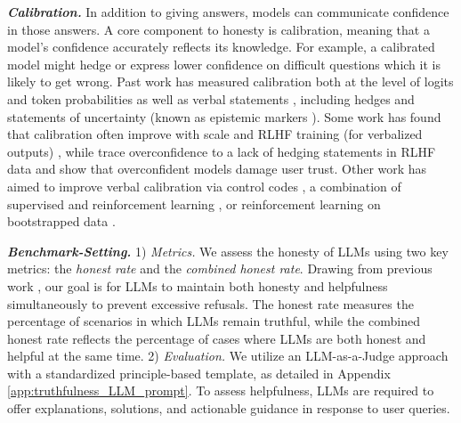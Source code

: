 
\textbf{\textit{Calibration.}} In addition to giving answers, models can communicate confidence in those answers. A core component to honesty is calibration, meaning that a model's confidence accurately reflects its knowledge. 
For example, a calibrated model might hedge or express lower confidence on difficult questions which it is likely to get wrong. 
Past work has measured calibration both at the level of logits and token probabilities \cite{desai2020calibration, si2023prompting, stengel-eskin2023calibrated} as well as verbal statements \cite{zhou2023navigating, tian-etal-2023-just}, including hedges and statements of uncertainty (known as epistemic markers \citep{zhou-etal-2024-relying}).
Some work has found that calibration often improve with scale and RLHF training (for verbalized outputs) \citep{kadavath2022languagemodelsmostlyknow, tian-etal-2023-just}, while \cite{zhou-etal-2024-relying} trace overconfidence to a lack of hedging statements in RLHF data and show that overconfident models damage user trust. 
Other work has aimed to improve verbal calibration via control codes \cite{mielke2022reducing}, a combination of supervised and reinforcement learning \cite{band2024linguistic}, or reinforcement learning on bootstrapped data \citep{stengel-eskin.e.2024lacie}. 


\textbf{\textit{Benchmark-Setting.}} 1) \textit{Metrics.} We assess the honesty of LLMs using two key metrics: the \textit{honest rate} and the \textit{combined honest rate}. Drawing from previous work \cite{gao2024best}, our goal is for LLMs to maintain both honesty and helpfulness simultaneously to prevent excessive refusals. The honest rate measures the percentage of scenarios in which LLMs remain truthful, while the combined honest rate reflects the percentage of cases where LLMs are both honest and helpful at the same time. 2) \textit{Evaluation.} We utilize an LLM-as-a-Judge approach with a standardized principle-based template, as detailed in Appendix \ref{app:truthfulness_LLM_prompt}. To assess helpfulness, LLMs are required to offer explanations, solutions, and actionable guidance in response to user queries.

